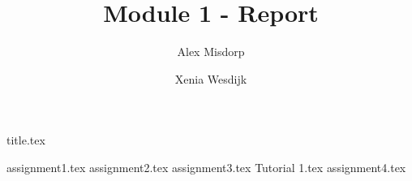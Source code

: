 \documentclass[final]{scrreprt} %
\title{Module 1 - Report}
\author{Alex {Misdorp} \and Xenia {Wesdijk}}
\begin{document}

{title.tex}

\newpage

\tableofcontents

\newpage
{}
{assignment1.tex}
{assignment2.tex}
{assignment3.tex}
{Tutorial 1.tex}
{assignment4.tex}
\newpage
{}

\printbibliography
\end{document}
